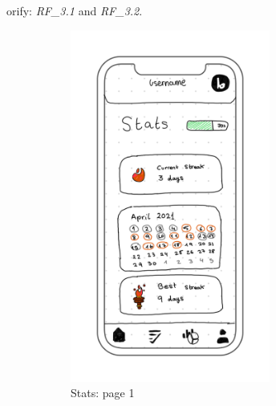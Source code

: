 orify: \textit{RF\_3.1} and \textit{RF\_3.2}. \\
\begin{figure}[H]
    \centering
    \begin{subfigure}[T]{0.32\textwidth}
        \centering
        \includegraphics[width=0.72\textwidth]{assets/screens/stats/Stats - 1.png}
        \caption{Stats: page 1}
        \label{fig:design_screen_stats_1}
    \end{subfigure}
    \hfill
    \begin{subfigure}[T]{0.32\textwidth}
        \centering

\end{subfigure}
\end{figure}
